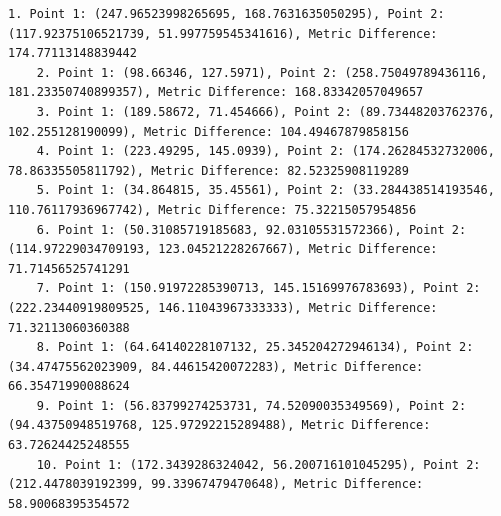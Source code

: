 \begin{lstlisting}[caption={Top 10 pairs with the most significant metric differences},label={lst:metric-diff},captionpos=b]
    1. Point 1: (247.96523998265695, 168.7631635050295), Point 2: (117.92375106521739, 51.997759545341616), Metric Difference: 174.77113148839442
    2. Point 1: (98.66346, 127.5971), Point 2: (258.75049789436116, 181.23350740899357), Metric Difference: 168.83342057049657
    3. Point 1: (189.58672, 71.454666), Point 2: (89.73448203762376, 102.255128190099), Metric Difference: 104.49467879858156
    4. Point 1: (223.49295, 145.0939), Point 2: (174.26284532732006, 78.86335505811792), Metric Difference: 82.52325908119289
    5. Point 1: (34.864815, 35.45561), Point 2: (33.284438514193546, 110.76117936967742), Metric Difference: 75.32215057954856
    6. Point 1: (50.31085719185683, 92.03105531572366), Point 2: (114.97229034709193, 123.04521228267667), Metric Difference: 71.71456525741291
    7. Point 1: (150.91972285390713, 145.15169976783693), Point 2: (222.23440919809525, 146.11043967333333), Metric Difference: 71.32113060360388
    8. Point 1: (64.64140228107132, 25.345204272946134), Point 2: (34.47475562023909, 84.44615420072283), Metric Difference: 66.35471990088624
    9. Point 1: (56.83799274253731, 74.52090035349569), Point 2: (94.43750948519768, 125.97292215289488), Metric Difference: 63.72624425248555
    10. Point 1: (172.3439286324042, 56.200716101045295), Point 2: (212.4478039192399, 99.33967479470648), Metric Difference: 58.90068395354572
\end{lstlisting}

